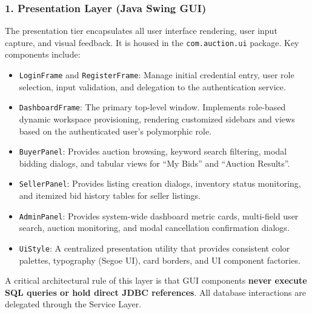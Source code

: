 \subsubsection{1. Presentation Layer (Java Swing GUI)}
The presentation tier encapsulates all user interface rendering, user input capture, and visual feedback. It is housed in the \texttt{com.auction.ui} package. Key components include:
\begin{itemize}
    \item \texttt{LoginFrame} and \texttt{RegisterFrame}: Manage initial credential entry, user role selection, input validation, and delegation to the authentication service.
    \item \texttt{DashboardFrame}: The primary top-level window. Implements role-based dynamic workspace provisioning, rendering customized sidebars and views based on the authenticated user's polymorphic role.
    \item \texttt{BuyerPanel}: Provides auction browsing, keyword search filtering, modal bidding dialogs, and tabular views for ``My Bids'' and ``Auction Results''.
    \item \texttt{SellerPanel}: Provides listing creation dialogs, inventory status monitoring, and itemized bid history tables for seller listings.
    \item \texttt{AdminPanel}: Provides system-wide dashboard metric cards, multi-field user search, auction monitoring, and modal cancellation confirmation dialogs.
    \item \texttt{UiStyle}: A centralized presentation utility that provides consistent color palettes, typography (Segoe UI), card borders, and UI component factories.
\end{itemize}

A critical architectural rule of this layer is that GUI components \textbf{never execute SQL queries or hold direct JDBC references}. All database interactions are delegated through the Service Layer.

